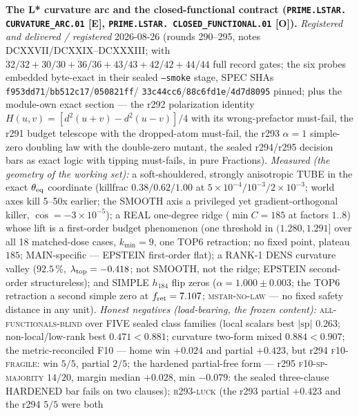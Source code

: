 \documentclass[11pt,a4paper]{article}
\begin{document}
\par\smallskip\noindent\textbf{The L* curvature arc and the
closed-functional contract (\texttt{PRIME.LSTAR.\allowbreak
CURVATURE\_ARC.01} [E], \texttt{PRIME.LSTAR.\allowbreak
CLOSED\_FUNCTIONAL.01} [O]).}
{\sloppy
\emph{Registered and delivered / registered} 2026-08-26 (rounds
290--295, notes DCXXVII/DCXXIX--DCXXXIII;
 with $32/32 + 30/30 + 36/36 +
43/43 + 42/42 + 44/44$ full record gates; the six probes embedded
byte-exact in their sealed \texttt{--smoke} stage, SPEC SHAs
\texttt{f953dd71}/\texttt{bb512c17}/\texttt{050821ff}/%
\texttt{33c44cc6}/\texttt{88c6fd1e}/\texttt{4d7d8095} pinned; plus
the module-own exact section --- the r292 polarization identity
$H(u,v) = [d^2(u{+}v) - d^2(u{-}v)]/4$ with its wrong-prefactor
must-fail, the r291 budget telescope with the dropped-atom
must-fail, the r293 $\alpha = 1$ simple-zero doubling law with the
double-zero mutant, the sealed r294/r295 decision bars as exact
logic with tipping must-fails, in pure Fractions).  \emph{Measured
(the geometry of the working set):} a soft-shouldered, strongly
anisotropic TUBE in the exact $\theta_{\rm eq}$ coordinate
(killfrac $0.38/0.62/1.00$ at $5\times10^{-4}/10^{-3}/
2\times10^{-3}$; world axes kill 5--50x earlier; the SMOOTH axis a
privileged yet gradient-orthogonal killer, $\cos =
-3\times10^{-5}$); a REAL one-degree ridge ($\min C = 185$ at
factors $1..8$) whose lift is a first-order budget phenomenon (one
threshold in $(1.280, 1.291]$ over all 18 matched-dose cases,
$k_{\min} = 9$, one TOP6 retraction; no fixed point, plateau $185$;
MAIN-specific --- EPSTEIN first-order flat); a RANK-1 DENS
curvature valley ($92.5\,\%$, $\lambda_{\rm top} = -0.418$; not
SMOOTH, not the ridge; EPSTEIN second-order structureless); and
SIMPLE $h_{184}$ flip zeros ($\alpha = 1.000 \pm 0.003$; the TOP6
retraction a second simple zero at $f_{\rm ret} = 7.107$;
\textsc{mstar-no-law} --- no fixed safety distance in any unit).
\emph{Honest negatives (load-bearing, the frozen content):}
\textsc{all-functionals-blind} over FIVE sealed class families
(local scalars best $|\mathrm{sp}|$ $0.263$; non-local/low-rank
best $0.471 < 0.881$; curvature two-form mixed $0.884 < 0.907$;
the metric-reconciled F10 --- home win $+0.024$ and partial
$+0.423$, but r294 \textsc{f10-fragile}: win $5/5$, partial $2/5$;
the hardened partial-free form --- r295 \textsc{f10-sp-majority}
$14/20$, margin median $+0.028$, min $-0.079$: the sealed
three-clause HARDENED bar fails on two clauses); \textsc{r293-luck}
(the r293 partial $+0.423$ and the r294 $5/5$ were both
}
\end{document}
